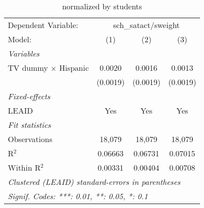 \begin{table}[htbp]
\centering
\caption{ normalized by students}
\begin{tabular}{lccc}
\tabularnewline\midrule\midrule
Dependent Variable:&\multicolumn{3}{c}{sch\_satact/sweight}\\
Model:&(1) & (2) & (3)\\
\midrule \emph{Variables}&   &   &  \\
TV dummy $\times$ Hispanic & 0.0020 & 0.0016 & 0.0013\\
  &(0.0019) & (0.0019) & (0.0019)\\
\midrule \emph{Fixed-effects}&   &   &  \\
LEAID & Yes & Yes & Yes\\
\midrule \emph{Fit statistics}&  & & \\
Observations & 18,079&18,079&18,079\\
R$^2$ & 0.06663&0.06731&0.07015\\
Within R$^2$ & 0.00331&0.00404&0.00708\\
\midrule\midrule\multicolumn{4}{l}{\emph{Clustered (LEAID) standard-errors in parentheses}}\\
\multicolumn{4}{l}{\emph{Signif. Codes: ***: 0.01, **: 0.05, *: 0.1}}\\
\end{tabular}
\end{table}

